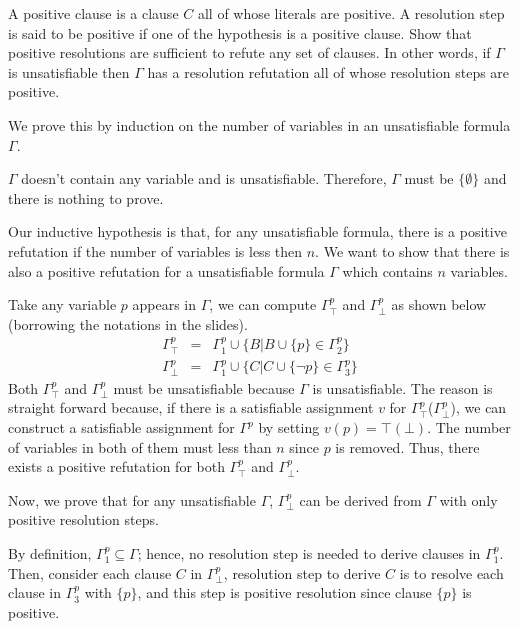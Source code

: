 \documentclass[11pt]{homework}
\begin{document}
\question
A positive clause is a clause \(C\) all of whose literals are positive.
A resolution step is said to be positive if one of the hypothesis is a positive
clause.
Show that positive resolutions are sufficient to refute any
set of clauses.
In other words, if \(\Gamma\) is unsatisfiable then \(\Gamma\) has a resolution
refutation all of whose resolution steps are positive.

We prove this by induction on the number of variables in an unsatisfiable formula \(\Gamma\).

\begin{induction}
\basecase
\(\Gamma\) doesn't contain any variable and is unsatisfiable. Therefore, \(\Gamma\) must be \(\{\emptyset\}\) and there is nothing to prove.

\indstep
Our inductive hypothesis is that, for any unsatisfiable formula, there is a positive refutation if the number of variables is less then \(n\).
We want to show that there is also a positive refutation for a unsatisfiable
formula \(\Gamma\) which contains \(n\) variables.

Take any variable \(p\) appears in \(\Gamma\), we can compute \(\Gamma^p_\top\) and  \(\Gamma^p_\bot\) as shown below (borrowing the notations in the slides).
\[
\begin{array}{lcl}
\Gamma^p_\top &=& \Gamma^p_1 \cup \{B| B \cup \{p\} \in \Gamma^p_2 \} \\
\Gamma^p_\bot &=& \Gamma^p_1 \cup \{C| C \cup \{\neg p\} \in \Gamma^p_3\}
\end{array}
\]
Both \(\Gamma^p_\top\) and \(\Gamma^p_\bot\) must be unsatisfiable because \(\Gamma\) is unsatisfiable. The reason is straight forward because, if there is a satisfiable assignment \(v\) for \(\Gamma^p_\top\)(\(\Gamma^p_\bot\)), we can construct a satisfiable assignment for \(\Gamma^p\) by setting \(v(p) = \top(\bot)\).
The number of variables in both of them must less than \(n\) since \(p\) is removed.
Thus, there exists a positive refutation for both \(\Gamma^p_\top\) and \(\Gamma^p_\bot\).

Now, we prove that for any unsatisfiable \(\Gamma\), \(\Gamma^p_\bot\) can be derived from \(\Gamma\) with only positive resolution steps.

By definition, \(\Gamma^p_1 \subseteq \Gamma\); hence, no resolution step is needed to derive clauses in \(\Gamma^p_1\). 
Then, consider each clause \(C\) in \(\Gamma^p_\bot\), resolution step to derive \(C\) is to resolve each clause in \(\Gamma^p_3\) with \(\{p\}\), and this step is positive resolution since clause \(\{p\}\) is positive.


\end{induction}
\end{document}
